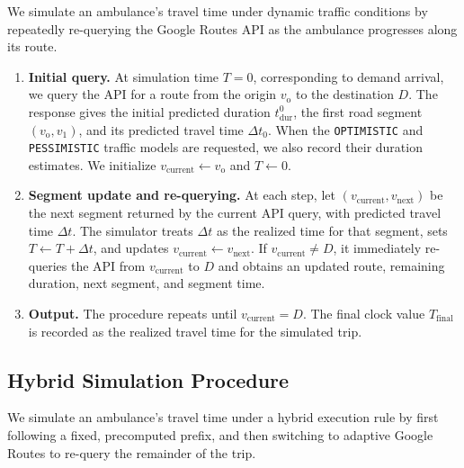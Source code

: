 \documentclass[11pt, letterpaper, oneside, reqno]{amsart}
\begin{document}
We simulate an ambulance's travel time under dynamic traffic conditions by repeatedly re-querying the Google Routes API as the ambulance progresses along its route.

\begin{enumerate}[leftmargin=7mm]
\item \textbf{Initial query.}
At simulation time $T=0$, corresponding to demand arrival, we query the API for a route from the origin $v_{\mathrm{o}}$ to the destination $D$. The response gives the initial predicted duration $t_{\mathrm{dur}}^0$, the first road segment $(v_{\mathrm{o}},v_1)$, and its predicted travel time $\Delta t_0$. When the \texttt{OPTIMISTIC} and \texttt{PESSIMISTIC} traffic models are requested, we also record their duration estimates. We initialize $v_{\mathrm{current}}\leftarrow v_{\mathrm{o}}$ and $T\leftarrow 0$.

\item \textbf{Segment update and re-querying.}
At each step, let $(v_{\mathrm{current}},v_{\mathrm{next}})$ be the next segment returned by the current API query, with predicted travel time $\Delta t$. The simulator treats $\Delta t$ as the realized time for that segment, sets $T\leftarrow T+\Delta t$, and updates $v_{\mathrm{current}}\leftarrow v_{\mathrm{next}}$. If $v_{\mathrm{current}}\neq D$, it immediately re-queries the API from $v_{\mathrm{current}}$ to $D$ and obtains an updated route, remaining duration, next segment, and segment time.

\item \textbf{Output.}
The procedure repeats until $v_{\mathrm{current}}=D$. The final clock value $T_{\mathrm{final}}$ is recorded as the realized travel time for the simulated trip.
\end{enumerate}

\subsection{Hybrid Simulation Procedure}
\label{ec:hybrid-simulation}

We simulate an ambulance's travel time under a hybrid execution rule by first following a fixed, precomputed prefix, and then switching to adaptive Google Routes to re-query the remainder of the trip.
\end{document}
